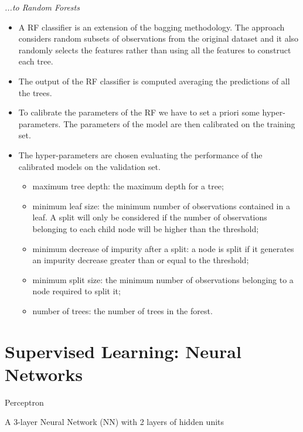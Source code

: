 \textit{...to Random Forests}
\begin{itemize}
    \item A RF classifier is an extension of the bagging methodology. The approach considers random subsets of observations from the original dataset and it also randomly selects the features rather than using all the features to construct each tree.
    \item The output of the RF classifier is computed averaging the predictions of all the trees.
\end{itemize}

\begin{itemize}
    \item To calibrate the parameters of the RF we have to set a priori some hyper-parameters. The parameters of the model are then calibrated on the training set.
    \item The hyper-parameters are chosen evaluating the performance of the calibrated models on the validation set. 
          \begin{itemize}
              \item maximum tree depth: the maximum depth for a tree; 
              \item minimum leaf size: the minimum number of observations contained in a leaf. A split will only be considered if the number of observations belonging to each child node will be higher than the threshold;
              \item minimum decrease of impurity after a split: a node is split if it generates an impurity decrease greater than or equal to the threshold;
              \item minimum split size: the minimum number of observations belonging to a node required to split it;
              \item number of trees: the number of trees in the forest.
          \end{itemize}
\end{itemize}

\section{Supervised Learning: Neural Networks}

Perceptron


A 3-layer Neural Network (NN) with 2 layers of hidden units



